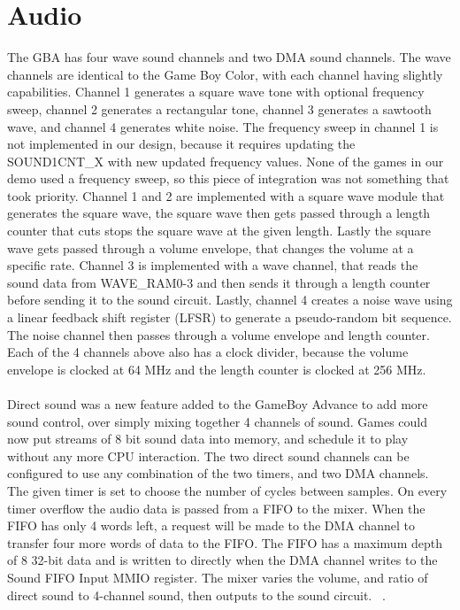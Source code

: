 \documentclass[11pt,a4paper]{article}
\begin{document}
	\section{Audio}
	The GBA has four wave sound channels and two DMA sound channels. The wave channels are identical to the Game Boy Color, with each channel having slightly capabilities. Channel 1 generates a square wave tone with optional frequency sweep, channel 2 generates a rectangular tone, channel 3 generates a sawtooth wave, and channel 4 generates white noise. The frequency sweep in channel 1 is not implemented in our design, because it requires updating the SOUND1CNT\_X with new updated frequency values.  None of the games in our demo used a frequency sweep, so this piece of integration was not something that took priority.  Channel 1 and 2 are implemented with a square wave module that generates the square wave, the square wave then gets passed through a length counter that cuts stops the square wave at the given length.  Lastly the square wave gets passed through a volume envelope, that changes the volume at a specific rate.  Channel 3 is implemented with a wave channel, that reads the sound data from WAVE\_RAM0-3 and then sends it through a length counter before sending it to the sound circuit.  Lastly, channel 4 creates a noise wave using a linear feedback shift register (LFSR) to generate a pseudo-random bit sequence.  The noise channel then passes through a volume envelope and length counter.  Each of the 4 channels above also has a clock divider, because the volume envelope is clocked at 64 MHz and the length counter is clocked at 256 MHz.\\\\
	Direct sound was a new feature added to the GameBoy Advance to add more sound control, over simply mixing together 4 channels of sound. Games could now put streams of 8 bit sound data into memory, and schedule it to play without any more CPU interaction.
	The two direct sound channels can be configured to use any combination of the two timers, and two DMA channels. The given timer is set to choose the number of cycles between samples. On every timer overflow the audio data is passed from a FIFO to the mixer. When the FIFO has only 4 words left, a request will be made to the DMA channel to transfer four more words of data to the FIFO. The FIFO has a maximum depth of 8 32-bit data and is written to directly when the DMA channel writes to the Sound FIFO Input MMIO register. The mixer varies the volume, and ratio of direct sound to 4-channel sound, then outputs to the sound circuit. ~\cite{GBAManual}.
	
\end{document}
